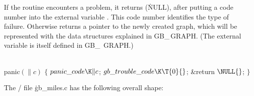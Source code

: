 If the  routine encounters a problem, it returns \PB{$%
\NULL$}
(\.{NULL}), after putting a code number into the external variable
. This code number identifies the type of failure.
Otherwise  returns a pointer to the newly created graph, which
will be represented with the data structures explained in {\sc GB\_\,GRAPH}.
(The external variable  is itself defined in {\sc GB\_%
\,GRAPH}.)

\Y\B\4\D\\{panic}$(\|c)$\5
${}\{{}$\5
\1${}\\{panic\_code}\K\|c{}$;\5
${}\\{gb\_trouble\_code}\K\T{0}{}$;\5
\&{return} ${}\NULL{}$;\5
${}\}{}$\2\par
\fi

The \CEE/ file \.{gb\_miles.c} has the following overall shape:

